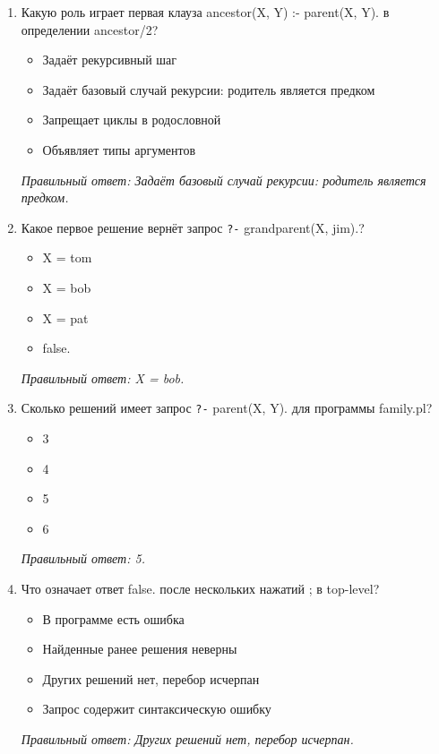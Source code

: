 \begin{enumerate}[label=\textbf{\arabic*.}, leftmargin=0pt, itemsep=1.2em]
\item Какую роль играет первая клауза ancestor(X, Y) :- parent(X, Y). в определении ancestor/2?
\begin{itemize}[label=$\square$, leftmargin=1.5cm, itemsep=0.2em, topsep=0.3em]
\item Задаёт рекурсивный шаг
\item Задаёт базовый случай рекурсии: родитель является предком
\item Запрещает циклы в родословной
\item Объявляет типы аргументов
\end{itemize}
{\small\textit{Правильный ответ: Задаёт базовый случай рекурсии: родитель является предком.}}

\item Какое первое решение вернёт запрос \texttt{?-} grandparent(X, jim).?
\begin{itemize}[label=$\square$, leftmargin=1.5cm, itemsep=0.2em, topsep=0.3em]
\item X = tom
\item X = bob
\item X = pat
\item false.
\end{itemize}
{\small\textit{Правильный ответ: X = bob.}}

\item Сколько решений имеет запрос \texttt{?-} parent(X, Y). для программы family.pl?
\begin{itemize}[label=$\square$, leftmargin=1.5cm, itemsep=0.2em, topsep=0.3em]
\item 3
\item 4
\item 5
\item 6
\end{itemize}
{\small\textit{Правильный ответ: 5.}}

\item Что означает ответ false. после нескольких нажатий ; в top-level?
\begin{itemize}[label=$\square$, leftmargin=1.5cm, itemsep=0.2em, topsep=0.3em]
\item В программе есть ошибка
\item Найденные ранее решения неверны
\item Других решений нет, перебор исчерпан
\item Запрос содержит синтаксическую ошибку
\end{itemize}
{\small\textit{Правильный ответ: Других решений нет, перебор исчерпан.}}


\end{enumerate}
